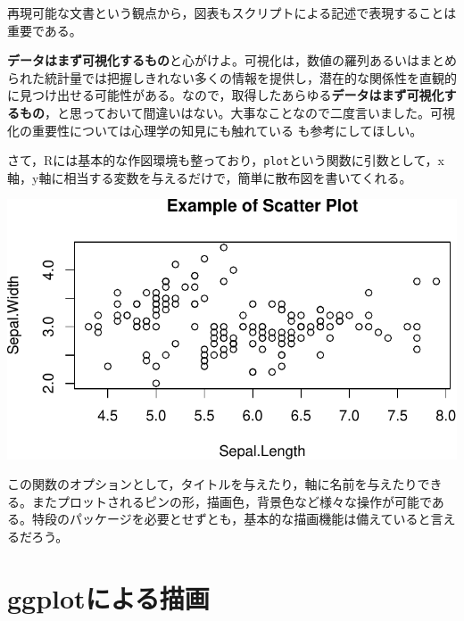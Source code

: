\documentclass[
  a4paper,
]{ltjsbook}
\newenvironment{Shaded}{\begin{snugshade}}{\end{snugshade}}
\newcommand{\AttributeTok}[1]{\textcolor[rgb]{0.40,0.45,0.13}{#1}}
\newcommand{\FunctionTok}[1]{\textcolor[rgb]{0.28,0.35,0.67}{#1}}
\newcommand{\NormalTok}[1]{\textcolor[rgb]{0.00,0.23,0.31}{#1}}
\newcommand{\SpecialCharTok}[1]{\textcolor[rgb]{0.37,0.37,0.37}{#1}}
\newcommand{\StringTok}[1]{\textcolor[rgb]{0.13,0.47,0.30}{#1}}
\begin{document}
再現可能な文書という観点から，図表もスクリプトによる記述で表現することは重要である。

\textbf{データはまず可視化するもの}と心がけよ。可視化は，数値の羅列あるいはまとめられた統計量では把握しきれない多くの情報を提供し，潜在的な関係性を直観的に見つけ出せる可能性がある。なので，取得したあらゆる\textbf{データはまず可視化するもの}，と思っておいて間違いはない。大事なことなので二度言いました。可視化の重要性については心理学の知見にも触れている
\textcite{Kieran2018} も参考にしてほしい。

さて，Rには基本的な作図環境も整っており，\texttt{plot}という関数に引数として，x軸，y軸に相当する変数を与えるだけで，簡単に散布図を書いてくれる。

\begin{Shaded}
\end{Shaded}

\includegraphics{chapter04_files/figure-pdf/RplotSample-1.pdf}

この関数のオプションとして，タイトルを与えたり，軸に名前を与えたりできる。またプロットされるピンの形，描画色，背景色など様々な操作が可能である。特段のパッケージを必要とせずとも，基本的な描画機能は備えていると言えるだろう。

\section{ggplotによる描画}\label{ggplotux306bux3088ux308bux63cfux753b}
\end{document}
